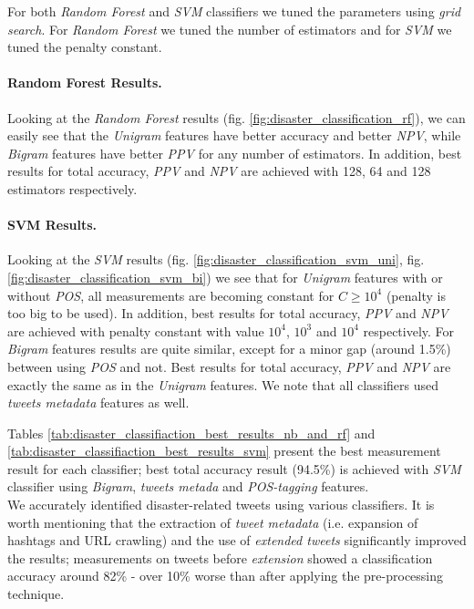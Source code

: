 \documentclass[letterpaper,twocolumn,10pt]{article}
\begin{document}
For both \textit{Random Forest} and \textit{SVM} classifiers we tuned the parameters using \textit{grid search}. For \textit{Random Forest} we tuned the number of estimators and for \textit{SVM} we tuned the penalty constant.

\paragraph{Random Forest Results.} Looking at the \textit{Random Forest} results (fig. \ref{fig:disaster_classification_rf}), we can easily see that the \textit{Unigram} features have better accuracy and better \textit{NPV}, while \textit{Bigram} features have better \textit{PPV} for any number of estimators. In addition, best results for total accuracy, \textit{PPV} and \textit{NPV} are achieved with 128, 64 and 128 estimators respectively.

\paragraph{SVM Results.} Looking at the \textit{SVM} results (fig. \ref{fig:disaster_classification_svm_uni}, fig. \ref{fig:disaster_classification_svm_bi}) we see that for \textit{Unigram} features with or without \textit{POS}, all measurements are becoming constant for $ C \ge 10^4 $ (penalty is too big to be used). In addition, best results for total accuracy, \textit{PPV} and \textit{NPV} are achieved with penalty constant with value $ 10^4 $, $ 10^3 $  and $ 10^4 $ respectively. For \textit{Bigram} features results are quite similar, except for a minor gap (around 1.5\%) between using \textit{POS} and not. Best results for total accuracy, \textit{PPV} and \textit{NPV} are exactly the same as in the \textit{Unigram} features. We note that all classifiers used \textit{tweets metadata} features as well.

Tables  \ref{tab:disaster_classifiaction_best_results_nb_and_rf} and \ref{tab:disaster_classifiaction_best_results_svm} present the best measurement result for each classifier; best total accuracy result (94.5\%) is achieved with \textit{SVM} classifier using \textit{Bigram}, \textit{tweets metada} and \textit{POS-tagging} features.\\

We accurately identified disaster-related tweets using various classifiers. It is worth mentioning that the extraction of \textit{tweet metadata} (i.e. expansion of hashtags and URL crawling) and the use of \textit{extended tweets} significantly improved the results; measurements on tweets before \textit{extension} showed a classification accuracy around 82\% - over 10\% worse than after applying the pre-processing technique.
\end{document}
